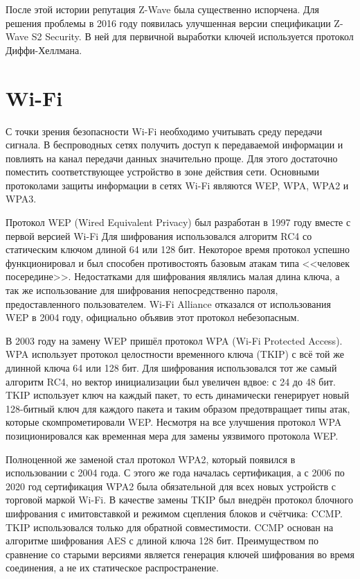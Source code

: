 	После этой истории репутация Z-Wave была существенно испорчена. Для решения проблемы в 2016 году
	появилась улучшенная версии спецификации Z-Wave S2 Security. В ней для первичной выработки ключей
	используется протокол Диффи-Хеллмана.
	
	
	\section{Wi-Fi}
	С точки зрения безопасности Wi-Fi необходимо учитывать среду передачи сигнала. В беспроводных сетях 
	получить доступ к передаваемой информации и повлиять на канал передачи данных значительно проще. 
	Для этого достаточно поместить соответствующее устройство в зоне действия сети. Основными протоколами
	защиты информации в сетях Wi-Fi являются WEP, WPA, WPA2 и WPA3.
	
	Протокол WEP (Wired Equivalent Privacy) был разработан в 1997 году вместе с первой версией Wi-Fi
	Для шифрования использовался алгоритм RC4 со статическим ключом длиной 64 или 128 бит. Некоторое время
	протокол успешно функционировал и был способен противостоять базовым атакам типа <<человек посередине>>.
	Недостатками для шифрования являлись малая длина ключа, а так же использование для шифрования 
	непосредственно пароля, предоставленного пользователем. Wi-Fi Alliance отказался от использования WEP
	в 2004 году, официально объявив этот протокол небезопасным.
	
	В 2003 году на замену WEP пришёл протокол WPA (Wi-Fi Protected Access). WPA использует протокол 
	целостности временного ключа (TKIP) с всё той же длинной ключа 64 или 128 бит. Для шифрования
	использовался тот же самый алгоритм RC4, но вектор инициализации был увеличен вдвое: с 24 до 48 бит.
	TKIP использует ключ на каждый пакет, то есть динамически генерирует новый 128-битный ключ для 
	каждого пакета и таким образом предотвращает типы атак, которые скомпрометировали WEP. Несмотря
	на все улучшения протокол WPA позиционировался как временная мера для замены уязвимого протокола
	WEP.
	
	Полноценной же заменой стал протокол WPA2, который появился в использовании с 2004 года. С этого
	же года началась сертификация, а с 2006 по 2020 год сертификация WPA2 была обязательной для всех
	новых устройств с торговой маркой Wi-Fi. В качестве замены TKIP был внедрён протокол блочного 
	шифрования с имитовставкой и режимом сцепления блоков и счётчика: CCMP. TKIP использовался
	только для обратной совместимости. CCMP основан на алгоритме шифрования AES с длиной ключа 128 бит.
	Преимуществом по сравнение со старыми версиями является генерация ключей шифрования во время
	соединения, а не их статическое распространение.
	
